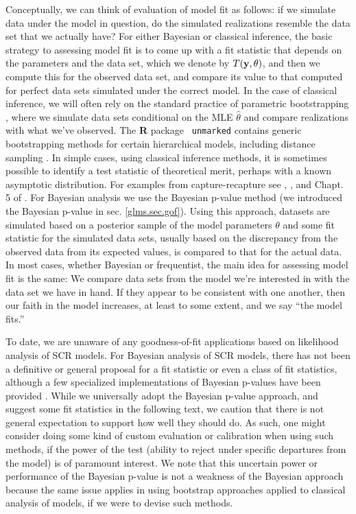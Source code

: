 Conceptually, we can think of evaluation of model fit as follows: if
we simulate data under the model in question, do the simulated
realizations resemble the data set that we actually have?  For either
Bayesian or classical inference, the basic strategy to assessing model
fit is to come up with a fit statistic that depends on the parameters
and the data set, which we denote by $T({\bf y}, \theta)$, and then we
compute this for the observed data set, and compare its value to that
computed for perfect data sets simulated under the correct model.  In
the case of classical inference, we will often rely on the standard
practice of parametric bootstrapping \citep{dixon:2002}, where we
simulate data sets conditional on the MLE $\hat{\theta}$ and compare
realizations with what we've observed.  The {\bf R} package \mbox{\tt
  unmarked} \citep{fiske_chandler:2011} contains generic bootstrapping
methods for certain hierarchical models, including distance sampling
\citep[e.g., see][for an application]{sillett_etal:2012}.  In simple
cases, using classical inference methods, it is sometimes possible to
identify a test statistic of theoretical merit, perhaps with a known
asymptotic distribution.  For examples from capture-recapture see
\citet{burnham_etal:1987}, \citet{lebreton_etal:1992}, and Chapt. 5 of
  \citet{cooch_white:2006}.  For Bayesian analysis we use the Bayesian
  p-value method \citep{gelman_etal:1996} (we introduced the Bayesian
  p-value in sec. \ref{glms.sec.gof}).  Using this approach, datasets
  are simulated based on a posterior sample of the model parameters
  $\theta$ and some fit statistic for the simulated data sets, usually
  based on the discrepancy from the observed data from its expected
  values, is compared to that for the actual data.  In most cases,
  whether Bayesian or frequentist, the main idea for assessing model
  fit is the same: We compare data sets from the model we're
  interested in with the data set we have in hand. If they appear to
  be consistent with one another, then our faith in the model
  increases, at least to some extent, and we say ``the model fits.''


To date, we are unaware of any goodness-of-fit applications based on
likelihood analysis of SCR models. For 
Bayesian analysis of SCR models, there has not been a definitive or
general proposal for a fit statistic or even a class of fit
statistics, although a few specialized implementations of Bayesian
p-values have been provided \citep{royle:2009,royle_etal:2011mee,
  gopalaswamy_etal:2012ecol,gopalaswamy_etal:2012mee,russell_etal:2012}.
While we universally adopt the Bayesian p-value approach, and suggest
some fit statistics in the following text, we caution that there is
not general expectation to support how well they should do.
As such, one might consider doing some kind of custom
evaluation or calibration when using such methods, if the power of the
test (ability to reject under specific departures from the model) is
of paramount interest.  We note that this uncertain power or
performance of the Bayesian p-value is not a weakness of the Bayesian
approach because the same issue applies in using bootstrap approaches
applied to classical analysis of models, if we were to devise such
methods.



